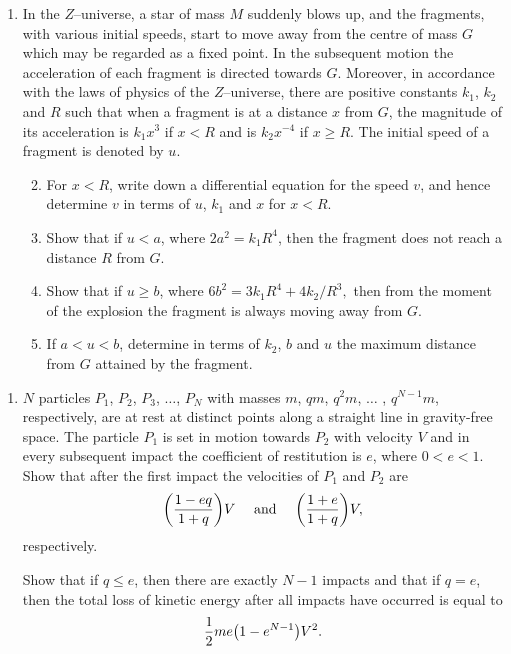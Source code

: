 \documentclass[a4, 11pt]{report}
\newlength{\qspace}
\newcounter{qnumber}
\newenvironment{question}%
 {\vspace{\qspace}
  \begin{enumerate}[\bfseries 1\quad][10]%
    \setcounter{enumi}{\value{qnumber}}%
    \item%
 }
{
  \end{enumerate}
  \filbreak
  \stepcounter{qnumber}
 }
\newenvironment{questionparts}[1][1]%
 {
  \begin{enumerate}[\bfseries (i)]%
    \setcounter{enumii}{#1}
    \addtocounter{enumii}{-1}
    \setlength{\itemsep}{5mm}
    \setlength{\parskip}{8pt}
 }
 {
  \end{enumerate}
 }
\def\le{\leqslant}
\def\ge{\geqslant}
\begin{document}
	
\begin{question}
In the $Z$--universe, a star of mass $M$
suddenly blows up, and the fragments, with various initial speeds, 
start to move away from the centre of mass $G$ which may be
regarded as a fixed point. In the  subsequent motion the 
acceleration of each fragment is directed towards $G$.
Moreover, in accordance with the laws of physics of the $Z$--universe, 
there  are positive constants 
$k_1$, $k_2$ and $R$ such that when a fragment is at a distance $x$
from $G$, the magnitude of its acceleration  is $k_1x^3$ if
$x<R$ and  is $k_2x^{-4}$ if $x \ge R$.
The initial speed of a fragment is denoted by $u$.

\begin{questionparts}
\item
For $x<R$, write down a differential equation for the speed $v$,
and hence determine $v$ in terms of $u$, $k_1$ and $x$ for $ x<R$.  
\item
 Show that if $u < a$, where $2a^2=k_1 R^4$, 
then the fragment does not reach a distance $R$ from $G$.
\item Show that if $u \ge b$, 
where 
$
6b^2= 3k_1R^4  + 4k_2 /R^3,
$ 
then from the moment
of the explosion the fragment is always moving away from $G$.
\item If $a<u<b$, determine in terms of 
$k_2$, $b$ and $u$ 
the maximum distance from $G$ attained by the fragment.
\end{questionparts}
	\end{question}
	
\begin{question}	
$N$ particles $P_1$, $P_2$, $P_3$, $\ldots$, $P_N$ with masses
$m$, $qm$, $q^2m$, $\ldots$ , ${q^{N-1}}m$, respectively,
are at rest 
at distinct points along a straight line in gravity-free space.
The particle $P_1$ is set in motion towards $P_2$ with velocity
$V$ and in every subsequent impact the coefficient of restitution
is $e$, where $0<e<1$. Show that after the first impact the
velocities of $P_1$ and $P_2$ are 
$$
{\left({{1-eq}\over{1+q}}\right)}V 
\mbox{ \ \ \ and \ \ \ } 
{\left({{1+e}\over{1+q}}\right)}V,
$$ respectively.  

Show that  if $q \le e$, then there are exactly $N-1$ impacts
and that if $q=e$, then the total loss of kinetic energy after all
impacts have occurred is equal to 
$$ 
{1\over 2}{me}{\left(1-e^{N-1}\right)}{V^2}.
$$ 

\end{question}
\end{document}
